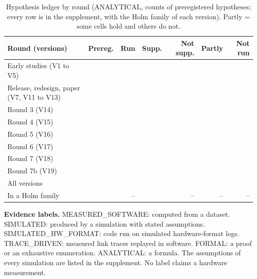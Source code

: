 \documentclass{ieeeaccess}
\begin{document}
\begin{table}[t]\centering\caption{Hypothesis ledger by round (ANALYTICAL, counts of preregistered hypotheses; every row is in the supplement, with the Holm family of each version). Partly = some cells hold and others do not.}\label{tab:ledger}\footnotesize\setlength{\tabcolsep}{2pt}
\begin{tabular}{p{2.3cm}rrrrrr}\toprule
Round (versions) & Prereg. & Run & Supp. & Not supp. & Partly & Not run\\\midrule
Early studies (V1 to V5) & \LgAPre{} & \LgARun{} & \LgASupp{} & \LgANot{} & \LgAPartly{} & \LgANotRun{}\\
Release, redesign, paper (V7, V11 to V13) & \LgBPre{} & \LgBRun{} & \LgBSupp{} & \LgBNot{} & \LgBPartly{} & \LgBNotRun{}\\
Round 3 (V14) & \LgCPre{} & \LgCRun{} & \LgCSupp{} & \LgCNot{} & \LgCPartly{} & \LgCNotRun{}\\
Round 4 (V15) & \LgDPre{} & \LgDRun{} & \LgDSupp{} & \LgDNot{} & \LgDPartly{} & \LgDNotRun{}\\
Round 5 (V16) & \LgEPre{} & \LgERun{} & \LgESupp{} & \LgENot{} & \LgEPartly{} & \LgENotRun{}\\
Round 6 (V17) & \LgFPre{} & \LgFRun{} & \LgFSupp{} & \LgFNot{} & \LgFPartly{} & \LgFNotRun{}\\
Round 7 (V18) & \LgGPre{} & \LgGRun{} & \LgGSupp{} & \LgGNot{} & \LgGPartly{} & \LgGNotRun{}\\
Round 7b (V19) & \LgHPre{} & \LgHRun{} & \LgHSupp{} & \LgHNot{} & \LgHPartly{} & \LgHNotRun{}\\\midrule
All versions & \LedgerN{} & \LedgerRun{} & \LedgerSupp{} & \LedgerNot{} & \LedgerPartly{} & \LedgerNotRun{}\\
In a Holm family & \LedgerConfN{} & -- & \LedgerConfSupp{} & -- & -- & --\\\bottomrule\end{tabular}\end{table}

\textbf{Evidence labels.} MEASURED\_SOFTWARE: computed from a dataset. SIMULATED: produced by a simulation with stated assumptions. SIMULATED\_HW\_FORMAT: code run on simulated hardware-format logs. TRACE\_DRIVEN: measured link traces replayed in software. FORMAL: a proof or an exhaustive enumeration. ANALYTICAL: a formula. The assumptions of every simulation are listed in the supplement. No label claims a hardware measurement.
\end{document}
